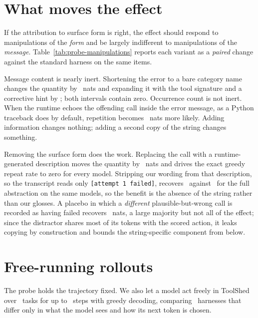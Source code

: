 \section{What moves the effect}
\label{sec:ws-manip}

If the attribution to surface form is right, the effect should respond to
manipulations of the \emph{form} and be largely indifferent to manipulations of
the \emph{message}. Table~\ref{tab:probe-manipulations} reports each variant as
a \emph{paired} change against the standard harness on the same items.



Message content is nearly inert. Shortening the error to a bare category name
changes the quantity by \DTerseCI\ nats and expanding it with the tool
signature and a corrective hint by \DVerboseCI; both intervals contain zero.
Occurrence count is not inert. When the runtime echoes the offending call
inside the error message, as a Python traceback does by default, repetition
becomes \DEchoCI\ nats more likely. Adding information changes nothing; adding
a second copy of the string changes something.

Removing the surface form does the work. Replacing the call with a
runtime-generated description moves the quantity by \DAbstractCI\ nats and
drives the exact greedy repeat rate to zero for every model. Stripping our
wording from that description, so the transcript reads only
\texttt{[attempt 1 failed]}, recovers \DAbstractMinCI\ against
\DAbstractMatchedCI\ for the full abstraction on the same models, so the
benefit is the absence of the string rather than our glosses. A placebo in
which a \emph{different} plausible-but-wrong call is recorded as having failed
recovers \DPlaceboCI\ nats, a large majority but not all of the effect; since
the distractor shares most of its tokens with the scored action, it leaks
copying by construction and bounds the string-specific component from below.

\section{Free-running rollouts}
\label{sec:ws-agent}

The probe holds the trajectory fixed. We also let a model act freely in
ToolShed over \AgentNumTasks\ tasks for up to \AgentMaxSteps\ steps with greedy
decoding, comparing \AgentNumHarnesses\ harnesses that differ only in what the
model sees and how its next token is chosen.


